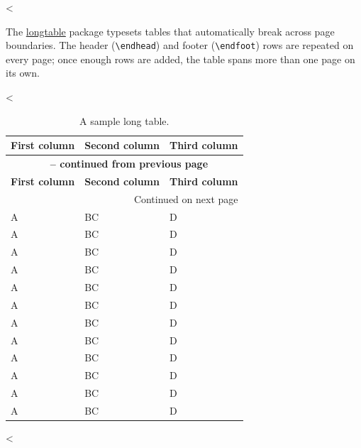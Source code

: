 <%

The \href{https://ctan.org/pkg/longtable}{longtable} package typesets tables that automatically break across page boundaries.
The header (\verb+\endhead+) and footer (\verb+\endfoot+) rows are repeated on every page; once enough rows are added, the table spans more than one page on its own.

<%
\begin{longtable}{lll}
  \caption{A sample long table.}\label{tab:long} \\
  \toprule
  \textbf{First column} & \textbf{Second column} & \textbf{Third column} \\
  \midrule
  \endfirsthead

  \multicolumn{3}{c}{{\bfseries \tablename\ \thetable{} -- continued from previous page}} \\
  \toprule
  \textbf{First column} & \textbf{Second column} & \textbf{Third column} \\
  \midrule
  \endhead

  \midrule
  \multicolumn{3}{r}{{Continued on next page}} \\
  \endfoot

  \bottomrule
  \endlastfoot

  A & BC & D \\
  A & BC & D \\
  A & BC & D \\
  A & BC & D \\
  A & BC & D \\
  A & BC & D \\
  A & BC & D \\
  A & BC & D \\
  A & BC & D \\
  A & BC & D \\
  A & BC & D \\
  A & BC & D \\
\end{longtable}
<%
